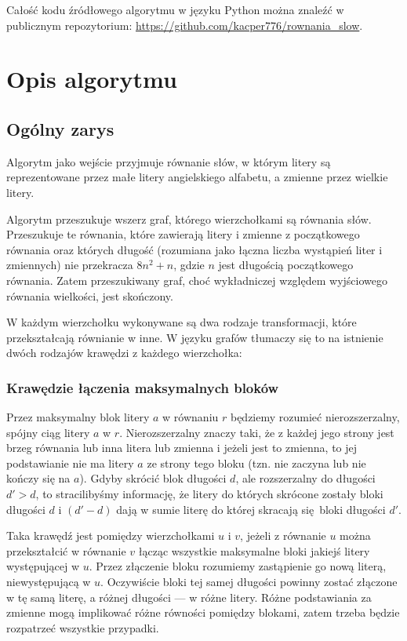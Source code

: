\documentclass[leqno, 12pt]{article}
\begin{document}
Całość kodu źródłowego algorytmu w języku Python można znaleźć w publicznym repozytorium: 
\href{https://github.com/kacper776/rownania\_slow}{https://github.com/kacper776/rownania\_slow}.

\newpage
\section{Opis algorytmu}

\subsection{Ogólny zarys}
Algorytm jako wejście przyjmuje równanie słów, w którym litery są reprezentowane przez małe litery angielskiego alfabetu, a zmienne przez wielkie litery.


Algorytm przeszukuje wszerz graf, którego wierzchołkami są równania słów. 
Przeszukuje te równania, które zawierają litery i zmienne z początkowego równania oraz których długość (rozumiana jako łączna liczba wystąpień liter i zmiennych) nie przekracza $8n^2 + n$, gdzie $n$ jest długością początkowego równania. Zatem przeszukiwany graf, choć wykładniczej względem wyjściowego równania wielkości, jest skończony.

W każdym wierzchołku wykonywane są dwa rodzaje transformacji, które przekształcają równianie w inne. W języku grafów tłumaczy się to na istnienie dwóch rodzajów krawędzi z każdego wierzchołka:

\subsubsection*{Krawędzie łączenia maksymalnych bloków}
Przez maksymalny blok litery $a$ w równaniu $r$ będziemy rozumieć nierozszerzalny, spójny ciąg litery $a$ w $r$. Nierozszerzalny znaczy taki, że z każdej jego strony jest brzeg równania lub inna litera lub zmienna i jeżeli jest to zmienna, to jej podstawianie nie ma litery $a$ ze strony tego bloku (tzn. nie zaczyna lub nie kończy się na $a$). Gdyby skrócić blok długości $d$, ale rozszerzalny do długości $d' > d$, to stracilibyśmy informację, że litery do których skrócone zostały bloki długości $d$ i $(d' - d)$ dają w sumie literę do której skracają się bloki długości $d'$.

Taka krawędź jest pomiędzy wierzchołkami $u$ i $v$, jeżeli z równanie $u$ można przekształcić w równanie $v$ łącząc wszystkie maksymalne bloki jakiejś litery występującej w $u$. Przez złączenie bloku rozumiemy zastąpienie go nową literą, niewystępującą w $u$. Oczywiście bloki tej samej długości powinny zostać złączone w tę samą literę, a różnej długości --- w różne litery.
Różne podstawiania za zmienne mogą implikować różne równości pomiędzy blokami, zatem trzeba będzie rozpatrzeć wszystkie przypadki.
\end{document}
